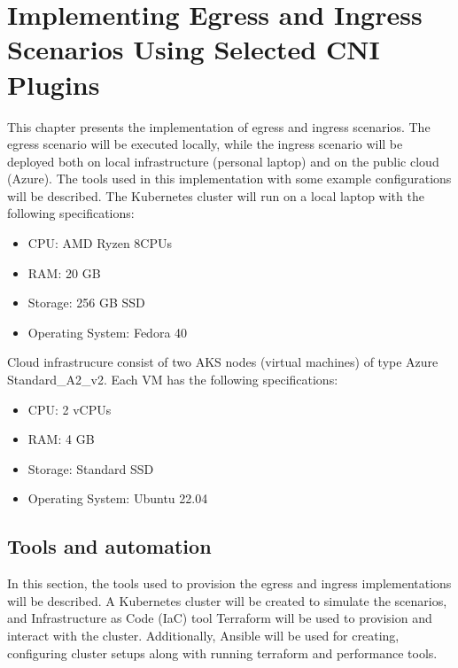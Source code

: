 \chapter{Implementing Egress and Ingress Scenarios Using Selected CNI Plugins}
\label{cha:practical_impl}

This chapter presents the implementation of egress and ingress scenarios. The egress scenario will be executed locally, while the ingress scenario will be deployed both on local infrastructure (personal laptop) and on the public cloud (Azure). The tools used in this implementation with some example configurations will be described.
The Kubernetes cluster will run on a local laptop with the following specifications:
\begin{itemize}
  \item CPU: AMD Ryzen 8CPUs
  \item RAM: 20 GB
  \item Storage: 256 GB SSD
  \item Operating System: Fedora 40
\end{itemize}

Cloud infrastrucure consist of two AKS nodes (virtual machines) of type Azure Standard\_A2\_v2. Each VM has the following specifications:
\begin{itemize}
  \item CPU: 2 vCPUs
  \item RAM: 4 GB
  \item Storage: Standard SSD
  \item Operating System: Ubuntu 22.04
\end{itemize}






\section{Tools and automation}
\label{sec:tools}

In this section, the tools used to provision the egress and ingress implementations will be described. A Kubernetes cluster will be created to simulate the scenarios, and Infrastructure as Code (IaC) tool Terraform will be used to provision and interact with the cluster. Additionally, Ansible will be used for creating, configuring cluster setups along with running terraform and performance tools.



